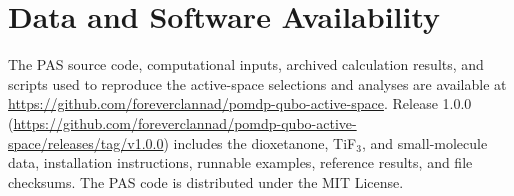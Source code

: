 \section*{Data and Software Availability}
The PAS source code, computational inputs, archived calculation results, and scripts used to reproduce the active-space selections and analyses are available at \url{https://github.com/foreverclannad/pomdp-qubo-active-space}. Release 1.0.0 (\url{https://github.com/foreverclannad/pomdp-qubo-active-space/releases/tag/v1.0.0}) includes the dioxetanone, TiF$_3$, and small-molecule data, installation instructions, runnable examples, reference results, and file checksums. The PAS code is distributed under the MIT License.
